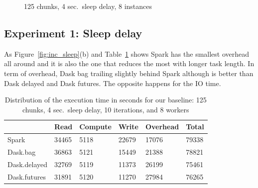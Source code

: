 \documentclass[conference]{IEEEtran}
\begin{document}
\begin{figure}[!t]
    \centering
    
    \caption{125 chunks, 4 sec.\ sleep delay, 8 instances}\label{fig:inc_itr}
\end{figure}


\subsection{Experiment 1: Sleep delay}
As Figure~\ref{fig:inc_sleep}(b) and Table~\ref{tb:inc-sleep} shows Spark has the
smallest overhead all around and it is also the one that reduces the most with longer
task length. In term of overhead, Dask bag trailing slightly behind Spark although is
better than Dask delayed and Dask futures. The opposite happens for the IO time.

\begin{table}[!t]
    \renewcommand{\arraystretch}{1.3}
    \caption{Distribution of the execution time in seconds for our baseline: 125
    chunks, 4 sec.\ sleep delay, 10 iterations, and 8 workers}\label{tb:inc-sleep}
    \centering
    \begin{tabular}{llllll}
    \hline
                 & Read  & Compute & Write & Overhead & Total \\ \hline
    Spark        & 34465 & 5118    & 22679 & 17076    & 79338 \\
    Dask.bag     & 36863 & 5121    & 15449 & 21388    & 78821 \\
    Dask.delayed & 32769 & 5119    & 11373 & 26199    & 75461 \\
    Dask.futures & 31891 & 5120    & 11270 & 27984    & 76265 \\ \hline
    \end{tabular}
 \end{table}
\end{document}
